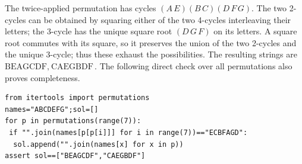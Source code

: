 The twice-applied permutation has cycles $(A\,E)(B\,C)(D\,F\,G)$. The two 2-cycles can be obtained by squaring either of the two 4-cycles interleaving their letters; the 3-cycle has the unique square root $(D\,G\,F)$ on its letters. A square root commutes with its square, so it preserves the union of the two 2-cycles and the unique 3-cycle; thus these exhaust the possibilities. The resulting strings are $\boxed{\text{BEAGCDF},\ \text{CAEGBDF}}$. The following direct check over all permutations also proves completeness.
\begin{verbatim}
from itertools import permutations
names="ABCDEFG";sol=[]
for p in permutations(range(7)):
 if "".join(names[p[p[i]]] for i in range(7))=="ECBFAGD":
  sol.append("".join(names[x] for x in p))
assert sol==["BEAGCDF","CAEGBDF"]
\end{verbatim}
